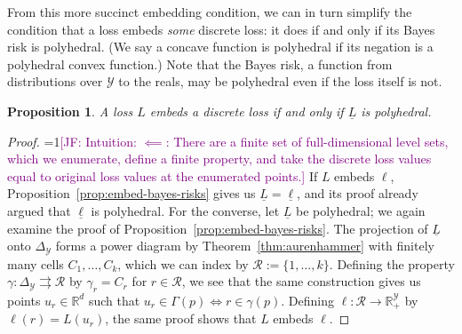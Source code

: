 \documentclass[12pt]{article}
\newcommand{\Comments}{1}
\newcommand{\mynote}[2]{\ifnum\Comments=1\textcolor{#1}{#2}\fi}
\newcommand{\jessie}[1]{\mynote{purple}{[JF: #1]}}
\newcommand{\reals}{\mathbb{R}}
\newcommand{\prop}[1]{\mathrm{prop}[#1]}
\newcommand{\simplex}{\Delta_\Y}
\newcommand{\R}{\mathcal{R}}
\newcommand{\U}{\mathcal{U}}
\newcommand{\Y}{\mathcal{Y}}
\newcommand{\risk}[1]{\underline{#1}}
\newcommand{\inter}[1]{\mathring{#1}}%
\newcommand{\toto}{\rightrightarrows}
\DeclareMathOperator*{\argmin}{arg\,min}
\newtheorem{proposition}{Proposition}
\begin{document}
From this more succinct embedding condition, we can in turn simplify the condition that a loss embeds \emph{some} discrete loss: it does if and only if its Bayes risk is polyhedral.
(We say a concave function is polyhedral if its negation is a polyhedral convex function.)
Note that the Bayes risk, a function from distributions over $\Y$ to the reals, may be polyhedral even if the loss itself is not.

\begin{proposition}\label{prop:embed-risk-poly}
  A loss $L$ embeds a discrete loss if and only if $\risk{L}$ is polyhedral.
\end{proposition}
\begin{proof}
	\jessie{Intuition: $\impliedby$: There are a finite set of full-dimensional level sets, which we enumerate, define a finite property, and take the discrete loss values equal to original loss values at the enumerated points.}
  If $L$ embeds $\ell$, Proposition~\ref{prop:embed-bayes-risks} gives us $\risk{L} = \risk{\ell}$, and its proof already argued that $\risk{\ell}$ is polyhedral.
  For the converse, let $\risk{L}$ be polyhedral; we again examine the proof of Proposition~\ref{prop:embed-bayes-risks}.
  The projection of $\risk{L}$ onto $\simplex$ forms a power diagram by Theorem~\ref{thm:aurenhammer} with finitely many cells $C_1,\ldots,C_k$, which we can index by $\R := \{1,\ldots,k\}$.
  Defining the property $\gamma:\simplex\toto\R$ by $\gamma_r = C_r$ for $r\in\R$, we see that the same construction gives us points $u_r \in\reals^d$ such that $u_r \in \Gamma(p) \iff r \in \gamma(p)$.
  Defining $\ell:\R\to\reals^\Y_+$ by $\ell(r) = L(u_r)$, the same proof shows that $L$ embeds $\ell$.

\end{proof}
\end{document}

